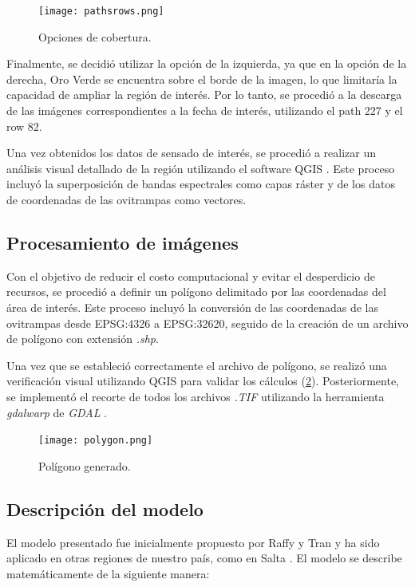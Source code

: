 \begin{figure}[H]
	\texttt{[image: pathsrows.png]}
	\centering
	\caption{Opciones de cobertura.}
	\label{fig:paths-rows}
	
\end{figure}

Finalmente, se decidió utilizar la opción de la izquierda, ya que en la opción de la derecha, Oro Verde se encuentra sobre el borde de la imagen, lo que limitaría la capacidad de ampliar la región de interés. Por lo tanto, se procedió a la descarga de las imágenes correspondientes a la fecha de interés, utilizando el path 227 y el row 82.

Una vez obtenidos los datos de sensado de interés, se procedió a realizar un análisis visual detallado de la región utilizando el software QGIS \parencite{noauthor_qgis_nodate}. Este proceso incluyó la superposición de bandas espectrales como capas ráster y de los datos de coordenadas de las ovitrampas como vectores.

\subsection{Procesamiento de imágenes}


Con el objetivo de reducir el costo computacional y evitar el desperdicio de recursos, se procedió a definir un polígono delimitado por las coordenadas del área de interés. Este proceso incluyó la conversión de las coordenadas de las ovitrampas desde EPSG:4326 a EPSG:32620, seguido de la creación de un archivo de polígono con extensión \textit{.shp}.

Una vez que se estableció correctamente el archivo de polígono, se realizó una verificación visual utilizando QGIS para validar los cálculos (\figurename \ref{fig:polygon}). Posteriormente, se implementó el recorte de todos los archivos \textit{.TIF} utilizando la herramienta \textit{gdalwarp} de \textit{GDAL} \parencite{frank_gdalwarp_nodate}. 


\begin{figure}[H]
	\texttt{[image: polygon.png]}
	\centering
	\caption{Polígono generado.}
	\label{fig:polygon}
\end{figure}

\subsection{Descripción del modelo}

El modelo presentado fue inicialmente propuesto por Raffy y Tran y ha sido aplicado en otras regiones de nuestro país, como en Salta \parencite{rotela_desarrollo_2012}. El modelo se describe matemáticamente de la siguiente manera:

